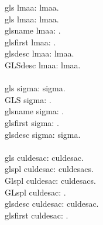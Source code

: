 gls lmaa: \gls{lmaa}.\\
gls lmaa: \gls{lmaa}.\\
glsname lmaa: .\\
glsfirst lmaa: .\\
glsdesc lmaa: \glsdesc{lmaa}.\\
GLSdesc lmaa: \GLSdesc{lmaa}.\\
\\
gls sigma: \gls{sigma}.\\
GLS sigma: .\\
glsname sigma: .\\
glsfirst sigma: .\\
glsdesc sigma: \glsdesc{sigma}.\\
\\
gls culdesac: \gls{culdesac}.\\
glspl culdesac: \glspl{culdesac}.\\
Glspl culdesac: \Glspl{culdesac}.\\
GLspl culdesac: .\\
glsdesc culdesac: \glsdesc{culdesac}.\\
glsfirst culdesac: .\\
